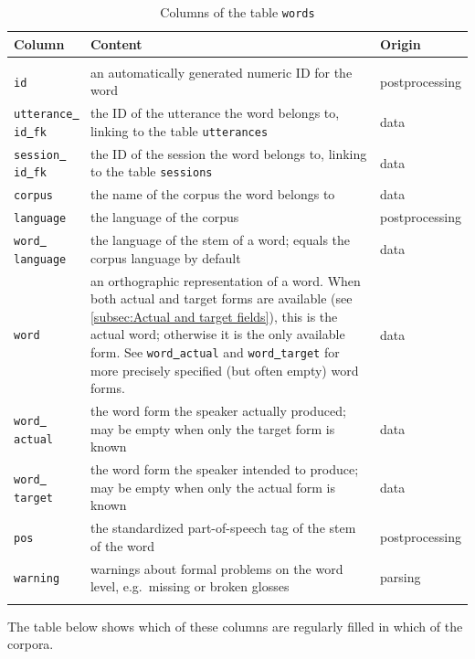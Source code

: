 \documentclass[a4paper, 11pt]{book}
\newcommand{\und}{\underline{{ }}\hspace{0.2mm}}	%
\begin{document}
\begin{longtable}{lp{.5\linewidth}p{.2\linewidth}}
	\toprule
		\textbf{Column} & \textbf{Content} 	& \textbf{Origin} \\
	\midrule
	\endhead
	
	\bottomrule\\[-0.15cm]
	\caption{Columns of the table \texttt{words}}
	\endfoot
	
		\texttt{id}	 				& an automatically generated numeric ID for the word & postprocessing \\
		\texttt{utterance\und id\und fk} & the ID of the utterance the word belongs to, linking to the table \texttt{utterances} & data \\
		\texttt{session\und id\und fk} & the ID of the session the word belongs to, linking to the table \texttt{sessions} & data \\
		\texttt{corpus} 			& the name of the corpus the word belongs to & data \\ 
		\texttt{language}			& the language of the corpus & postprocessing \\
		\texttt{word\und language}	& the language of the stem of a word; equals the corpus language by default & data \\							  
		\texttt{word}				& an orthographic representation of a word. When both actual and target forms are available 
									  (see \autoref{subsec:Actual and target fields}), this is the actual word; otherwise it is the only available form. 
									  See \texttt{word\und actual} and \texttt{word\und target} for more precisely specified (but often empty) word forms. & data \\
		\texttt{word\und actual}	& the word form the speaker actually produced; may be empty when only the target form is known & data \\
		\texttt{word\und target}	& the word form the speaker intended to produce; may be empty when only the actual form is known & data \\
		\texttt{pos}				& the standardized part-of-speech tag of the stem of the word & postprocessing \\
		\texttt{warning}			& warnings about formal problems on the word level, e.g.\ missing or broken glosses & parsing \\

	\label{tab:Table words}
\end{longtable}

The table below shows which of these columns are regularly filled in which of the corpora. 
\end{document}
